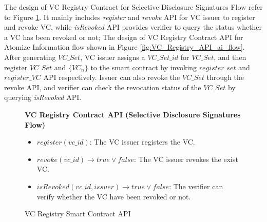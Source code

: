 \documentclass[conference, dvipdfmx]{IEEEtran} %
\begin{document}
\begin{sloppypar}
The design of VC Registry Contract for Selective Disclosure Signatures Flow refer to Figure \ref{fig:VC_Registry_API_sd_flow}.  It mainly includes \textit{register} and \textit{revoke} API for VC issuer to register and revoke VC, while \textit{isRevoked} API provides verifier to query the status whether a VC has been revoked or not;
The design of VC Registry Contract API for Atomize Information flow shown in Figure \ref{fig:VC_Registry_API_ai_flow}. After generating $VC\_Set$, VC issuer assigns a $VC\_Set\_id$ for $VC\_Set$, and then register $VC\_Set$ and $\{VC_n\}$ to the smart contract by invoking $register\_set$ and $register\_VC$ API respectively. 
Issuer can also revoke the $VC\_Set$ through the revoke API, and verifier can check the revocation status of the $VC\_Set$ by querying \textit{isRevoked} API.

\begin{figure}[htbp]
  \centering
  \begin{varwidth}{8.5cm}
  \fbox
  {\parbox{\textwidth}
    {
      \begin{center}
        \textbf{VC Registry Contract API (Selective Disclosure Signatures Flow)}
      \end{center}
      \begin{itemize}
        \item $register(vc\_id)$: The VC issuer registers the VC.
        \item $revoke(vc\_id) 	\rightarrow true \lor false$: The VC issuer revokes the exist VC. 
        \item $isRevoked(vc\_id, issuer)  \rightarrow true \lor false$: The verifier can verify whether the VC have been revoked or not. 
      \end{itemize}
    }
  }
  \end{varwidth}
  \caption{VC Registry Smart Contract API}
  \label{fig:VC_Registry_API_sd_flow}
\end{figure}


\end{sloppypar}
\end{document}
